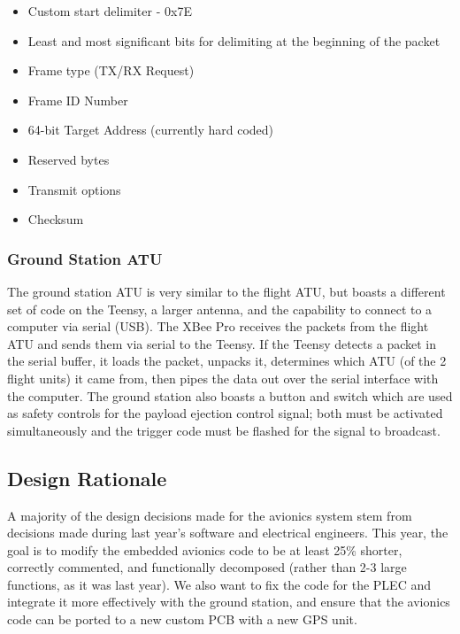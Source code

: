 \documentclass[journal,10pt,draftclsnofoot,onecolumn,compsoc]{IEEEtran} \usepackage[margin=0.75in]{geometry}
\begin{document}
\begin{itemize}
    \item Custom start delimiter - 0x7E
    \item Least and most significant bits for delimiting at the beginning of the packet
    \item Frame type (TX/RX Request)
    \item Frame ID Number
    \item 64-bit Target Address (currently hard coded)
    \item Reserved bytes
    \item Transmit options
    \item Checksum
\end{itemize}

\subsubsection{Ground Station ATU}
The ground station ATU is very similar to the flight ATU, but boasts a different set of code on the Teensy, a larger antenna, and the capability to connect to a computer via serial (USB). The XBee Pro receives the packets from the flight ATU and sends them via serial to the Teensy. If the Teensy detects a packet in the serial buffer, it loads the packet, unpacks it, determines which ATU (of the 2 flight units) it came from, then pipes the data out over the serial interface with the computer. The ground station also boasts a button and switch which are used as safety controls for the payload ejection control signal; both must be activated simultaneously and the trigger code must be flashed for the signal to broadcast.  \newline

\subsection{Design Rationale}
A majority of the design decisions made for the avionics system stem from decisions made during last year's software and electrical engineers. This year, the goal is to modify the embedded avionics code to be at least 25\% shorter, correctly commented, and functionally decomposed (rather than 2-3 large functions, as it was last year). We also want to fix the code for the PLEC and integrate it more effectively with the ground station, and ensure that the avionics code can be ported to a new custom PCB with a new GPS unit.
\end{document}
